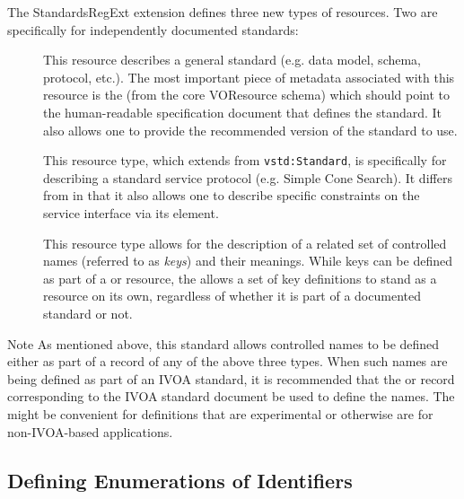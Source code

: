 \documentclass[11pt,a4paper]{ivoa}
\begin{document}
The StandardsRegExt extension defines three new types of resources.  Two
are specifically for independently documented standards:

\begin{description}
\item[] This resource describes a general standard (e.g. data model,
       schema, protocol, etc.).  The most important piece of metadata
       associated with this resource is the
       (from the core VOResource schema) 
       which should point to the human-readable specification document
       that defines the standard.  It also allows one to provide the
       recommended version of the standard to use.  
\item[] This resource type, which extends from
       \texttt{vstd:Standard}, is specifically for describing a
       standard service protocol (e.g. Simple Cone Search).  It
       differs from  in that it also allows
       one to describe specific constraints on the service interface
       via its
       element. 
\item[] This resource type allows for the description of a related set of 
       controlled names (referred to as \emph{keys}) and their
       meanings.  While keys can be defined as part of a
        or 
       resource, the  allows 
       a set of key definitions to stand as a resource on its own,
       regardless of whether it is part of a documented standard or
       not.  

\end{description}

\begin{admonition}{Note}
       As mentioned above, this standard allows controlled names to be
       defined either as part of a record of any of the above three
       types.  When such names are being defined as part of an IVOA
       standard, it is recommended that the  or
        record corresponding to the
       IVOA standard document be used to define the names.  The
        might be convenient
       for definitions that are experimental or otherwise are for
       non-IVOA-based applications.  
\end{admonition}


\subsection{Defining Enumerations of Identifiers }
\label{sect:keys}
\end{document}
